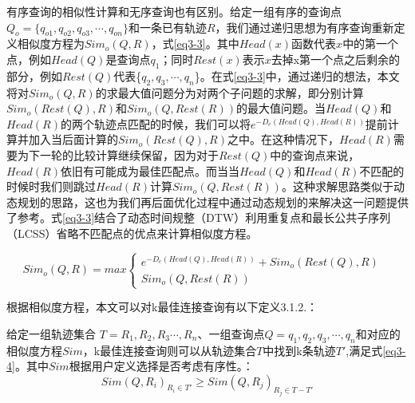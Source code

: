 有序查询的相似性计算和无序查询也有区别。给定一组有序的查询点$Q_{o} = \{q_{o1},q_{o2},q_{o3},\cdots, q_{on}\}$和一条已有轨迹$R$，我们通过递归思想为有序查询重新定义相似度方程为$Sim_{o}(Q,R)$，式\ref{eq3-3}。其中$Head(x)$函数代表$x$中的第一个点，例如$Head(Q)$是查询点$q_{1}$；同时$Rest(x)$表示$x$去掉x第一个点之后剩余的部分，例如$Rest(Q)$代表\{$q_{2},q_{3},\cdots, q_{n}$\}。在式\ref{eq3-3}中，通过递归的想法，本文将对$Sim_{o}(Q,R)$的求最大值问题分为对两个子问题的求解，即分别计算$Sim_{o}(Rest(Q),R)$和$Sim_{o}(Q,Rest(R))$的最大值问题。当$Head(Q)$和$Head(R)$的两个轨迹点匹配的时候，我们可以将$e^{-D_{e}(Head(Q), Head(R))}$提前计算并加入当后面计算的$Sim_{o}(Rest(Q),R)$之中。在这种情况下，$Head(R)$需要为下一轮的比较计算继续保留，因为对于$Rest(Q)$中的查询点来说，$Head(R)$依旧有可能成为最佳匹配点。而当当$Head(Q)$和$Head(R)$不匹配的时候时我们则跳过$Head(R)$计算$Sim_{o}(Q,Rest(R))$。这种求解思路类似于动态规划的思路，这也为我们再后面优化过程中通过动态规划的来解决这一问题提供了参考。式\ref{eq3-3}结合了动态时间规整（DTW）利用重复点和最长公共子序列（LCSS）省略不匹配点的优点来计算相似度方程。

\begin{equation} 
\label{eq3-3} 
Sim_{o}(Q,R)= max \left\{  
	\begin{array}{lr}  
    e^{-D_{e}(Head(Q), Head(R))} + Sim_{o}(Rest(Q),R) & \\
    Sim_{o}(Q,Rest(R)) &  
    \end{array}  
\right.  
\end{equation}  

根据相似度方程，本文可以对k最佳连接查询有以下定义3.1.2.：


\theoremstyle{definition}
\begin{definition}
	给定一组轨迹集合 $T = {R_{1}, R_{2}, R_{3} \cdots, R_{n}}$、一组查询点$Q = {q_{1},q_{2},q_{3},\cdots, q_{n}}$和对应的相似度方程$Sim$，k最佳连接查询则可以从轨迹集合$T$中找到k条轨迹$T'$,满足式\ref{eq3-4}。其中$Sim$根据用户定义选择是否考虑有序性。：
	\begin{equation}
		\label{eq3-4}
		Sim(Q,R_{i})_{R_{i} \in T'} \geq Sim(Q,R_{j})_{R_{j} \in T-T'}
	\end{equation}
\end{definition}

